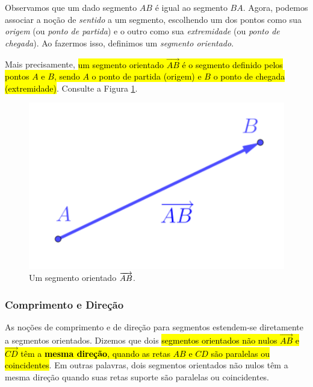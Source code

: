 
Observamos que um dado segmento $AB$ é igual ao segmento $BA$. Agora, podemos associar a noção de \emph{sentido} a um segmento, escolhendo um dos pontos como sua \emph{origem} (ou \emph{ponto de partida}) e o outro como sua \emph{extremidade} (ou \emph{ponto de chegada}). Ao fazermos isso, definimos um \emph{segmento orientado}.

Mais precisamente, \hl{um segmento orientado $\overrightarrow{AB}$ é o segmento definido pelos pontos $A$ e $B$, sendo $A$ o ponto de partida (origem) e $B$ o ponto de chegada (extremidade)}. Consulte a Figura \ref{cap_vetor_sec_segorien:fig:seg_orientado}.

\begin{figure}[h]
  \centering
  \includegraphics{./cap_vetor/dados/fig_seg_orientado/fig.png}
  \caption{Um segmento orientado $\protect\overrightarrow{AB}$.}
  \label{cap_vetor_sec_segorien:fig:seg_orientado}
\end{figure}

\subsubsection{Comprimento e Direção}

As noções de comprimento e de direção para segmentos estendem-se diretamente a segmentos orientados. Dizemos que dois \hl{segmentos orientados não nulos $\overrightarrow{AB}$ e $\overrightarrow{CD}$ têm a \textbf{mesma direção}, quando as retas $AB$ e $CD$ são paralelas ou coincidentes}. Em outras palavras, dois segmentos orientados não nulos têm a mesma direção quando suas retas suporte são paralelas ou coincidentes.

